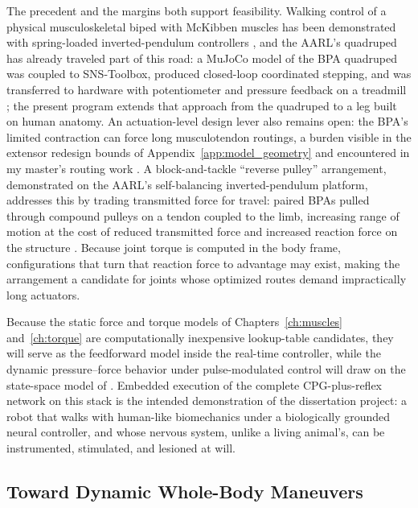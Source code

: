 The precedent and the margins both support feasibility. Walking control of a physical musculoskeletal biped with McKibben muscles has been demonstrated with spring-loaded inverted-pendulum controllers \citep{li_controller_2024}, and the AARL's quadruped has already traveled part of this road: a MuJoCo model of the BPA quadruped was coupled to SNS-Toolbox, produced closed-loop coordinated stepping, and was transferred to hardware with potentiometer and pressure feedback on a treadmill \citep{lutz_mechanical_2025}; the present program extends that approach from the quadruped to a leg built on human anatomy. An actuation-level design lever also remains open: the BPA's limited contraction can force long musculotendon routings, a burden visible in the extensor redesign bounds of Appendix~\ref{app:model_geometry} and encountered in my master's routing work \citep{bolen_determination_2019}. A block-and-tackle ``reverse pulley'' arrangement, demonstrated on the AARL's self-balancing inverted-pendulum platform, addresses this by trading transmitted force for travel: paired BPAs pulled through compound pulleys on a tendon coupled to the limb, increasing range of motion at the cost of reduced transmitted force and increased reaction force on the structure \citep{bolen_balance_2024, bolen_selfbalancing_2024, bolen_selfbalancing_srs_2024}. Because joint torque is computed in the body frame, configurations that turn that reaction force to advantage may exist, making the arrangement a candidate for joints whose optimized routes demand impractically long actuators.

Because the static force and torque models of Chapters~\ref{ch:muscles} and~\ref{ch:torque} are computationally inexpensive lookup-table candidates, they will serve as the feedforward model inside the real-time controller, while the dynamic pressure--force behavior under pulse-modulated control will draw on the state-space model of \citet{elzein_pressure_2025}. Embedded execution of the complete CPG-plus-reflex network on this stack is the intended demonstration of the dissertation project: a robot that walks with human-like biomechanics under a biologically grounded neural controller, and whose nervous system, unlike a living animal's, can be instrumented, stimulated, and lesioned at will.

\subsection{Toward Dynamic Whole-Body Maneuvers}\label{sec:fw_kickflip}

